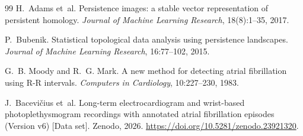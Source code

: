 \documentclass[11pt]{article}
\begin{document}
\begin{thebibliography}{99}
H.~Adams et~al.
Persistence images: a stable vector representation of persistent homology.
\emph{Journal of Machine Learning Research}, 18(8):1--35, 2017.

P.~Bubenik.
Statistical topological data analysis using persistence landscapes.
\emph{Journal of Machine Learning Research}, 16:77--102, 2015.

G.~B. Moody and R.~G. Mark.
A new method for detecting atrial fibrillation using R-R intervals.
\emph{Computers in Cardiology}, 10:227--230, 1983.

J.~Bacevi\v{c}ius et~al.
Long-term electrocardiogram and wrist-based photoplethysmogram recordings
with annotated atrial fibrillation episodes (Version v6) [Data set].
Zenodo, 2026.
\url{https://doi.org/10.5281/zenodo.23921320}.

\end{thebibliography}
\end{document}
